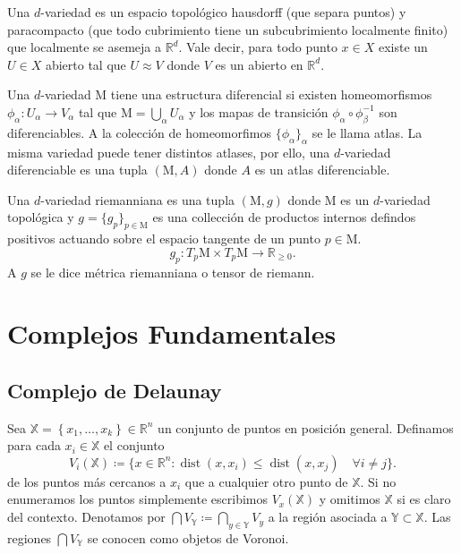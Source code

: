 \documentclass[legalpaper,12pt]{article}
\newcommand{\X}{\mathbb{X}}
\newcommand{\Y}{\mathbb{Y}}
\newcommand{\R}{\mathbb{R}}
\newcommand{\MM}{\mathrm{M}}
\DeclareMathOperator{\dist}{dist}
\begin{document}
Una \(d\)-variedad es un espacio topológico hausdorff (que separa puntos) y paracompacto
(que todo cubrimiento tiene un subcubrimiento localmente finito) que localmente se asemeja
a \(\R^d\). Vale decir, para todo punto \(x\in X\) existe un \(U\in X\) abierto
tal que \(U\approx V\) donde \(V\) es un abierto en \(\R^d\).   

Una \(d\)-variedad \(\MM\) tiene una estructura diferencial si existen homeomorfismos
\(\phi_{\alpha} \colon U_{\alpha} \to V_{\alpha}\) tal que \(\MM = \bigcup_{\alpha} U_{\alpha}\)
y los mapas de transición \(\phi_{\alpha}\circ\phi_{\beta}^{-1}\) son diferenciables.
A la colección de homeomorfimos \(\lbrace \phi_{\alpha} \rbrace_{\alpha}\) se le 
llama atlas. La misma variedad puede tener distintos atlases, por ello, una \(d\)-variedad
diferenciable es una tupla \((\MM, A)\) donde \(A\) es un atlas diferenciable.

Una \(d\)-variedad riemanniana es una tupla \((\MM,g)\) donde \(\MM\) es un \(d\)-variedad topológica
y \(g = \lbrace g_p \rbrace_{p\in \MM}\) es una collección de productos internos defindos positivos
actuando sobre el espacio tangente de un punto \(p\in \MM\).
\begin{displaymath}
  g_p \colon T_p \MM \times T_p \MM \to \R_{\ge 0}.
\end{displaymath}
A \(g\) se le dice métrica riemanniana o tensor de riemann. 

\section{Complejos Fundamentales}

\subsection{Complejo de Delaunay}

Sea \(\X = \left\{ x_1, \dots, x_k \right\} \in \R^n\) un conjunto de puntos en posición
general. Definamos para cada \(x_i\in \X\) el conjunto
\begin{displaymath}
  V_i(\X) \coloneqq \lbrace x\in \R^n \colon \dist(x,x_i) \le \dist(x,x_j)\quad \forall i\ne j\rbrace.
\end{displaymath}
de los puntos más cercanos a \(x_i\) que a cualquier otro punto de \(\X\). Si no enumeramos
los puntos simplemente escribimos \(V_{x}(\X)\) y omitimos \(\X\) si es claro del contexto.  
Denotamos por \(\bigcap V_{\Y} \coloneqq \bigcap_{y\in \Y} V_{y}\) a la región asociada
a \(\Y\subset \X\). Las regiones \(\bigcap V_{\Y}\) se conocen como objetos de Voronoi.
\end{document}
